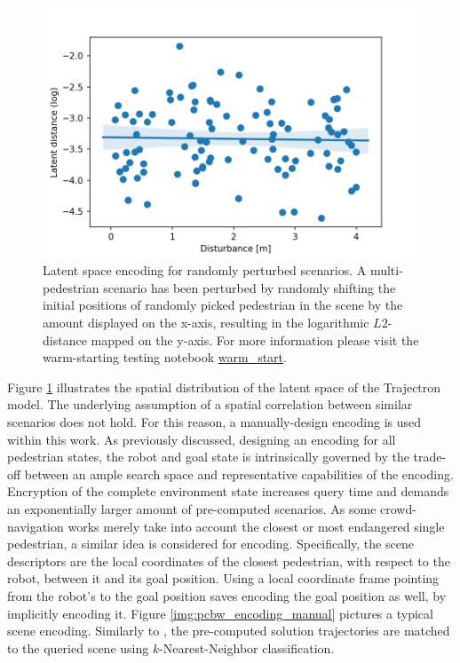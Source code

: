 \begin{figure}[!ht]
\begin{center}
\includegraphics[width=\imgwidth]{images/enc_latent_reg.png}
\caption{Latent space encoding for randomly perturbed scenarios. A multi-pedestrian scenario has been perturbed by randomly shifting the initial positions of randomly picked pedestrian in the scene by the amount displayed on the x-axis, resulting in the logarithmic $L2$-distance mapped on the y-axis. For more information please visit the warm-starting testing notebook \href{https://github.com/simon-schaefer/mantrap/blob/master/examples/warm_start.ipynb}{warm\_start}.}
\label{img:pcbw_encoding_latent}
\end{center}
\end{figure}

Figure \ref{img:pcbw_encoding_latent} illustrates the spatial distribution of the latent space of the Trajectron model. The underlying assumption of a spatial correlation between similar scenarios does not hold. For this reason, a manually-design encoding is used within this work. As previously discussed, designing an encoding for all pedestrian states, the robot and goal state is intrinsically governed by the trade-off between an ample search space and representative capabilities of the encoding. Encryption of the complete environment state increases query time and demands an exponentially larger amount of pre-computed scenarios. As some crowd-navigation works merely take into account the closest or most endangered single pedestrian, a similar idea is considered for encoding. Specifically, the scene descriptors are the local coordinates of the closest pedestrian, with respect to the robot, between it and its goal position. Using a local coordinate frame pointing from the robot's to the goal position saves encoding the goal position as well, by implicitly encoding it. Figure \ref{img:pcbw_encoding_manual} pictures a typical scene encoding. Similarly to \cite{Merkt2018}, the pre-computed solution trajectories are matched to the queried scene using $k$-Nearest-Neighbor classification. 

